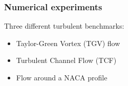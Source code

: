 \begin{frame}[t]
\frametitle{Numerical experiments}
\vfill
Three different turbulent benchmarks:
\begin{itemize}
\item Taylor-Green Vortex (TGV) flow
\item Turbulent Channel Flow (TCF)
\item Flow around a NACA profile
\end{itemize}
\vfill
\end{frame}